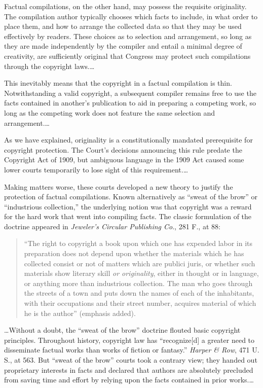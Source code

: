 Factual compilations, on the other hand, may possess the requisite originality.
The compilation author typically chooses which facts to include, in what order
to place them, and how to arrange the collected data so that they may be used
effectively by readers. These choices as to selection and arrangement, so long
as they are made independently by the compiler and entail a minimal degree of
creativity, are sufficiently original that Congress may protect such
compilations through the copyright laws.\ldots

This inevitably means that the copyright in a factual compilation is thin.
Notwithstanding a valid copyright, a subsequent compiler remains free to use
the facts contained in another's publication to aid in preparing a competing
work, so long as the competing work does not feature the same selection and
arrangement.\ldots


As we have explained, originality is a constitutionally mandated prerequisite
for copyright protection. The Court's decisions announcing this rule predate
the Copyright Act of 1909, but ambiguous language in the 1909 Act caused some
lower courts temporarily to lose sight of this requirement.\ldots

Making matters worse, these courts developed a new theory to justify the
protection of factual compilations. Known alternatively as ``sweat of the
brow'' or ``industrious collection,'' the underlying notion was that copyright
was a reward for the hard work that went into compiling facts. The classic
formulation of the doctrine appeared in \textit{Jeweler's Circular Publishing
Co}., 281 F., at 88:
\begin{quote}
``The right to copyright a book upon which one has expended labor in its
preparation does not depend upon whether the materials which he has collected
consist or not of matters which are publici juris, or whether such materials
show literary skill \textit{or originality}, either in thought or in language,
or anything more than industrious collection. The man who goes through the
streets of a town and puts down the names of each of the inhabitants, with
their occupations and their street number, acquires material of which he is the
author'' (emphasis added).
\end{quote}
\dots Without a doubt, the ``sweat of the brow'' doctrine flouted basic
copyright principles. Throughout history, copyright law has ``recognize[d] a
greater need to disseminate factual works than works of fiction or fantasy.''
\textit{Harper \& Row}, 471 U. S., at 563. But ``sweat of the brow'' courts
took a contrary view; they handed out proprietary interests in facts and
declared that authors are absolutely precluded from saving time and effort by
relying upon the facts contained in prior works.\ldots

